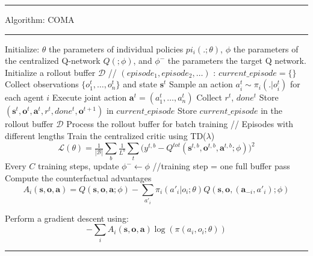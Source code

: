 \documentclass[varwidth, border=20pt]{standalone}
\begin{document}
\begingroup
\small                    
\begin{center}
  \begin{minipage}{0.99\linewidth} 
    \hrule height 0.7pt
    \vspace{3pt}
    Algorithm: COMA
    \vspace{3pt}
    \hrule height 0.7pt
    \vspace{6pt}

   
    \begin{algorithmic}[1]
      \State Initialize: $\theta$ the parameters of individual policies $pi_i(.;\theta)$, $\phi$ the parameters of the centralized Q-network $Q(;\phi)$, and $\phi^-$ the parameters the target Q network. 
        \State Initialize a rollout buffer $\mathcal{D}$ // $(episode_1, episode_2, \dots)$
        :
            \State $current\_episode = \{ \}$ 
                \State Collect observations $\{o^t_1,\dots,o^t_n\}$ and state $\mathbf{s}^t$
                \State  Sample an action $a_i^t \sim \pi_i(.|o_i^t)$ for each agent $i$
                \State Execute joint action $\mathbf{a}^t = (a_1^t,\dots,a_n^t)$
                \State Collect $r^t$, $done^t$
                \State Store $(\mathbf{s}^t,\mathbf{o}^t,\mathbf{a}^t,r^t,done^t,\mathbf{o}^{t+1})$ in $current\_episode$
                \EndWhile
            \State Store $current\_episode$ in the rollout buffer $\mathcal{D}$
        \EndFor
        \State Process the rollout buffer for batch training // Episodes with different lengths
        \State Train the centralized critic using TD($\lambda$)
        \Statex
          \[
            \mathcal{L}(\theta)=\tfrac{1}{|\mathcal{B}|}\sum_b \tfrac{1}{L^b} \sum_t \Big(y^{t,b}- Q^{tot}(\mathbf{s}^{t,b},\mathbf{o}^{t,b},\mathbf{a}^{t,b}; \phi)\Big)^2
          \]
        \State Every $C$ training steps, update $\phi^- \leftarrow \phi$ //training step = one full buffer pass
        \State Compute the counterfactual advantages
         \[
            A_i(\mathbf{s}, \mathbf{o},\mathbf{a}) = Q(\mathbf{s}, \mathbf{o},\mathbf{a};\phi) - \sum_{a'_i} \pi_i(a'_i|o_i;\theta) Q(\mathbf{s}, \mathbf{o},(\mathbf{a}_{-i},a'_i);\phi)
         \]

         \State Perform a gradient descent using:
         \[ 
             - \sum_i A_i(\mathbf{s}, \mathbf{o},\mathbf{a}) \log(\pi(a_i,o_i;\theta))
         \]

      \EndWhile
    \end{algorithmic}

    \vspace{6pt}
    \hrule height 0.7pt
  \end{minipage}
\end{center}
\endgroup
\end{document}
